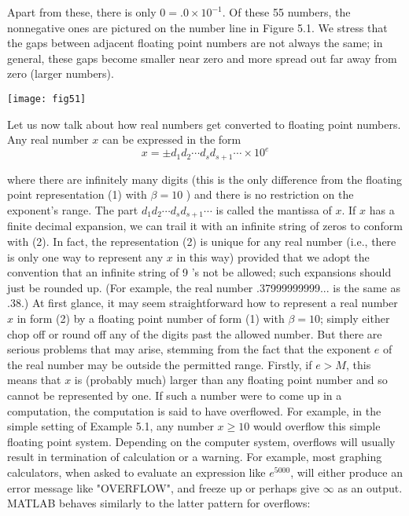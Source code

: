 \documentclass[../main.tex]{subfiles}
\begin{document}
\begin{minipage}[t]{.6\linewidth}
Apart from these, there is only $0=.0 \times 10^{-1}$. Of these 55 numbers, the nonnegative ones are pictured on the number line in Figure 5.1. We stress that the gaps between adjacent floating point numbers are not always the same; in general, these gaps become smaller near zero and more spread out far away from zero (larger numbers).

\end{minipage}
\hspace{0.02\linewidth}
\begin{minipage}[t]{.5\linewidth}
  \strut\vspace*{-\baselineskip}\newline\texttt{[image: fig51]}
\label{fig:fig_5_1}
\end{minipage}


Let us now talk about how real numbers get converted to floating point numbers. Any real number $x$ can be expressed in the form
$$
x=\pm d_{1} d_{2} \cdots d_{s} d_{s+1} \cdots \times 10^{e}
$$

where there are infinitely many digits (this is the only difference from the floating point representation (1) with $\beta=10$ ) and there is no restriction on the exponent's range. The part $d_{1} d_{2} \cdots d_{s} d_{s+1} \cdots$ is called the mantissa of $x$. If $x$ has a finite decimal expansion, we can trail it with an infinite string of zeros to conform with (2). In fact, the representation (2) is unique for any real number (i.e., there is only one way to represent any $x$ in this way) provided that we adopt the convention that an infinite string of 9 's not be allowed; such expansions should just be rounded up. (For example, the real number .37999999999... is the same as .38.) At first glance, it may seem straightforward how to represent a real number $x$ in form (2) by a floating point number of form (1) with $\beta=10$; simply either chop off or round off any of the digits past the allowed number. But there are serious problems that may arise, stemming from the fact that the exponent $e$ of the real number may be outside the permitted range. Firstly, if $e>M$, this means that $x$ is (probably much) larger than any floating point number and so cannot be represented by one. If such a number were to come up in a computation, the computation is said to have overflowed. For example, in the simple setting of Example 5.1, any number $x \geq 10$ would overflow this simple floating point system. Depending on the computer system, overflows will usually result in termination of calculation or a warning. For example, most graphing calculators, when asked to evaluate an expression like $e^{5000}$, will either produce an error message like "OVERFLOW", and freeze up or perhaps give $\infty$ as an output. MATLAB behaves similarly to the latter pattern for overflows:
\end{document}
